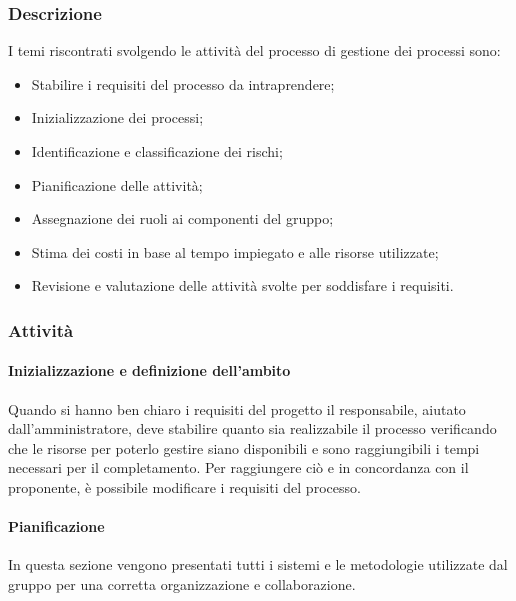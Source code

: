 \subsubsection{Descrizione}
I temi riscontrati svolgendo le attività del processo di gestione dei processi sono:
\begin{itemize}
	\item Stabilire i requisiti del processo da intraprendere;
	\item Inizializzazione dei processi;
	\item Identificazione e classificazione dei rischi;
	\item Pianificazione delle attività; 
	\item Assegnazione dei ruoli ai componenti del gruppo;
	\item Stima dei costi in base al tempo impiegato e alle risorse utilizzate;
	\item Revisione e valutazione delle attività svolte per soddisfare i requisiti.
\end{itemize}

\subsubsection{Attività}
\paragraph{Inizializzazione e definizione dell'ambito}
Quando si hanno ben chiaro i requisiti del progetto il responsabile, aiutato dall'amministratore, deve stabilire quanto sia realizzabile il processo verificando che le risorse per poterlo gestire siano disponibili e sono raggiungibili i tempi necessari per il completamento.
Per raggiungere ciò e in concordanza con il proponente, è possibile modificare i requisiti del processo.

\paragraph{Pianificazione}
In questa sezione vengono presentati tutti i sistemi e le metodologie utilizzate dal gruppo per una corretta organizzazione e collaborazione.

